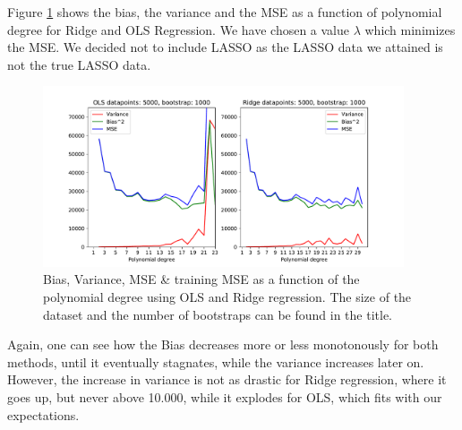 \documentclass[11pt,a4paper,titlepage]{article}
\begin{document}
Figure \ref{fig:biasVariance_Korea} shows the bias, the variance and the MSE as a function of polynomial degree for Ridge and OLS Regression. We have chosen a value $\lambda$ which minimizes the MSE. We decided not to include LASSO as the LASSO data we attained is not the true LASSO data.
\begin{figure}[H]
\centering
\includegraphics[width=0.95\textwidth]{figures/presentable_data/Bias_variance_Korea.pdf}
\caption[Bias, Variance, MSE \& training MSE as a function of the polynomial degree for Geodata]{Bias, Variance, MSE \& training MSE as a function of the polynomial degree using OLS and Ridge regression. The size of the dataset and the number of bootstraps can be found in the title.}
\label{fig:biasVariance_Korea}
\end{figure}
 Again, one can see how the Bias decreases more or less monotonously for both methods, until it eventually stagnates, while the variance increases later on. However, the increase in variance is not as drastic for Ridge regression, where it goes up, but never above 10.000, while it explodes for OLS, which fits with our expectations. 
\end{document}
